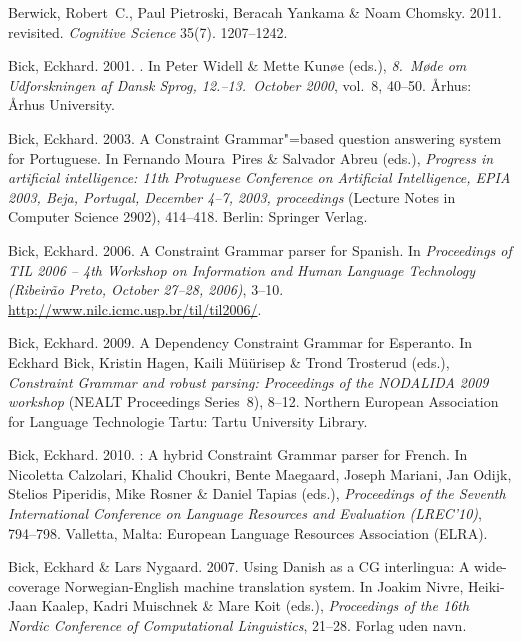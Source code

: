 \begin{thebibliography}{1420}
Berwick, Robert~C., Paul Pietroski, Beracah Yankama \& Noam Chomsky. 2011.
 revisited.
\newblock \emph{Cognitive Science} 35(7). 1207--1242.

Bick, Eckhard. 2001.
.
\newblock In Peter Widell \& Mette Kun{\o}e (eds.), \emph{{8.\ M{\o}de om
  Udforskningen af Dansk Sprog, 12.--13.\ October 2000}}, vol.~8, 40--50.
  {\AA}rhus: {\AA}rhus University.

Bick, Eckhard. 2003.
\newblock A {Constraint Grammar}"=based question answering system for
  {Portuguese}.
\newblock In Fernando Moura~Pires \& Salvador Abreu (eds.), \emph{Progress in
  artificial intelligence: 11th {Protuguese Conference on Artificial
  Intelligence, EPIA 2003, Beja, Portugal, December 4--7, 2003}, proceedings}
  (Lecture Notes in Computer Science 2902), 414--418. Berlin: Springer Verlag.

Bick, Eckhard. 2006.
\newblock A {Constraint Grammar} parser for {Spanish}.
\newblock In \emph{Proceedings of {TIL 2006} -- 4th {Workshop on Information
  and Human Language Technology (Ribeir{\~a}o Preto, October 27--28, 2006)}},
  3--10.
\newblock \urlprefix\url{http://www.nilc.icmc.usp.br/til/til2006/}.

Bick, Eckhard. 2009.
\newblock A {Dependency Constraint Grammar} for {Esperanto}.
\newblock In Eckhard Bick, Kristin Hagen, Kaili M{\"u}{\"u}risep \& Trond
  Trosterud (eds.), \emph{{Constraint Grammar} and robust parsing: Proceedings
  of the {NODALIDA 2009} workshop} (NEALT Proceedings Series~8), 8--12.
  Northern European Association for Language Technologie Tartu: Tartu
  University Library.

Bick, Eckhard. 2010.
: {A} hybrid {Constraint Grammar} parser for {French}.
\newblock In Nicoletta Calzolari, Khalid Choukri, Bente Maegaard, Joseph
  Mariani, Jan Odijk, Stelios Piperidis, Mike Rosner \& Daniel Tapias (eds.),
  \emph{Proceedings of the {Seventh International Conference on Language
  Resources and Evaluation (LREC'10)}}, 794--798. Valletta, Malta: European
  Language Resources Association (ELRA).

Bick, Eckhard \& Lars Nygaard. 2007.
\newblock Using {Danish} as a {CG} interlingua: {A} wide-coverage
  {Norwegian-English} machine translation system.
\newblock In Joakim Nivre, Heiki-Jaan Kaalep, Kadri Muischnek \& Mare Koit
  (eds.), \emph{Proceedings of the 16th {Nordic Conference of Computational
  Linguistics}}, 21--28. Forlag uden navn.


\end{thebibliography}

